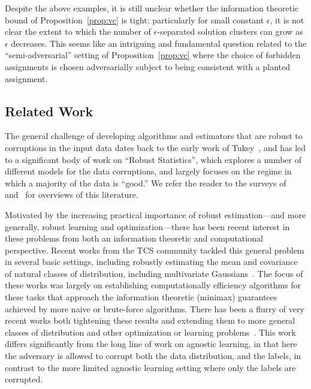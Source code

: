 \documentclass[final,12pt]{colt2018}
\newcommand{\eps}{\epsilon}
\begin{document}
Despite the above examples, it is still unclear whether the information theoretic bound of Proposition~\ref{prop:vc} is tight; particularly for small constant $\eps$, it is not clear the extent to which the number of $\eps$-separated solution clusters can grow as $\eps$ decreases.  This seems like an intriguing and fundamental question related to the ``semi-adversarial'' setting of Proposition~\ref{prop:vc} where the choice of forbidden assignments is chosen adversarially subject to being consistent with a planted assignment.

\subsection{Related Work}

The general challenge of developing algorithms and estimators that are robust to corruptions in the input data dates back to the early work of Tukey~\citep{tukey1960survey}, and has led to a significant body of work on  ``Robust Statistics'', which explores a number of different models for the data corruptions, and largely focuses on the regime in which a majority of the data is ``good.''   We refer the reader to the surveys of~\citep{huber2011robust} and~\citep{hampel2011robust} for overviews of this literature.

Motivated by the increasing practical importance of robust estimation---and more generally, robust learning and optimization---there has been recent interest in these problems from both an information theoretic and computational perspective.   Recent works from the TCS community tackled this general problem in several basic settings, including robustly estimating the mean and covariance of natural classes of distribution, including multivariate Gaussians~\citep{diakonikolas2016robust,lai2016agnostic}.   The focus of these works was largely on establishing computationally efficiency algorithms for these tasks that approach the information theoretic (minimax) guarantees achieved by more naive or brute-force algorithms.  There has been a flurry of very recent works both tightening these results and extending them to more general classes of distribution and other optimization or learning problems~\citep{steinhardt2018resilience,kothari2017better,kothari2017outlier,diakonikolas2017learning}.   This work differs significantly from the long line of work on agnostic learning, in that here the adversary is allowed to corrupt both the data distribution, and the labels, in contrast to the more limited agnostic learning setting where only the labels are corrupted.
\end{document}
